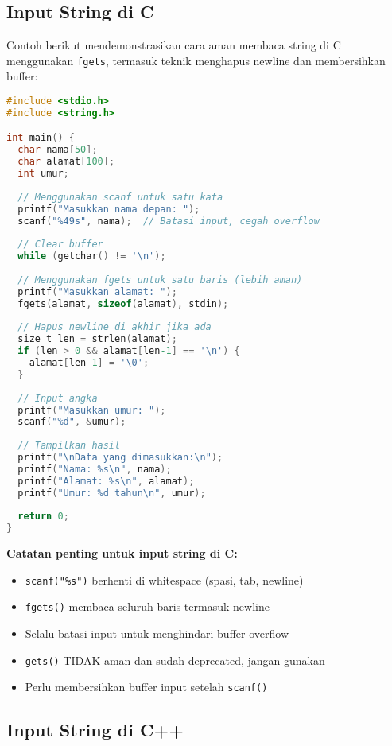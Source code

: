 \documentclass[../main.tex]{subfiles}
\begin{document}
\subsection{Input String di C}

Contoh berikut mendemonstrasikan cara aman membaca string di C menggunakan \texttt{fgets}, termasuk teknik menghapus newline dan membersihkan buffer:

\begin{lstlisting}[language=C, caption={Input string di C}]
#include <stdio.h>
#include <string.h>

int main() {
  char nama[50];
  char alamat[100];
  int umur;
  
  // Menggunakan scanf untuk satu kata
  printf("Masukkan nama depan: ");
  scanf("%49s", nama);  // Batasi input, cegah overflow
  
  // Clear buffer
  while (getchar() != '\n');
  
  // Menggunakan fgets untuk satu baris (lebih aman)
  printf("Masukkan alamat: ");
  fgets(alamat, sizeof(alamat), stdin);
  
  // Hapus newline di akhir jika ada
  size_t len = strlen(alamat);
  if (len > 0 && alamat[len-1] == '\n') {
    alamat[len-1] = '\0';
  }
  
  // Input angka
  printf("Masukkan umur: ");
  scanf("%d", &umur);
  
  // Tampilkan hasil
  printf("\nData yang dimasukkan:\n");
  printf("Nama: %s\n", nama);
  printf("Alamat: %s\n", alamat);
  printf("Umur: %d tahun\n", umur);
  
  return 0;
}
\end{lstlisting}

\textbf{Catatan penting untuk input string di C:}
\begin{itemize}
  \item \texttt{scanf("\%s")} berhenti di whitespace (spasi, tab, newline)
  \item \texttt{fgets()} membaca seluruh baris termasuk newline
  \item Selalu batasi input untuk menghindari buffer overflow
  \item \texttt{gets()} TIDAK aman dan sudah deprecated, jangan gunakan
  \item Perlu membersihkan buffer input setelah \texttt{scanf()}
\end{itemize}

\subsection{Input String di C++}
\end{document}

